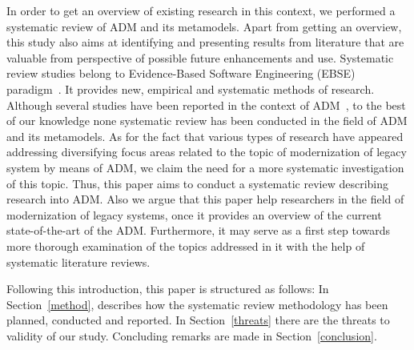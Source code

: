In order to get an overview of existing research in this context, we performed a systematic review of ADM and its metamodels. Apart from getting an overview, this study also aims at identifying and presenting results from literature that are valuable from perspective of possible future enhancements and use. Systematic review studies belong to Evidence-Based Software Engineering (EBSE) paradigm~\cite{Kitchenham}. It provides new, empirical and systematic methods of research. Although several studies have been reported in the context of ADM~\cite{PerezCastillo20121370, SMR:SMR582, FuentesFernandez2012247, PrezCastillo2011519}, to the best of our knowledge none systematic review has been conducted in the field of ADM and its metamodels. As for the fact that various types of research have appeared addressing diversifying focus areas related to the topic of modernization of legacy system by means of ADM, we claim the need for a more systematic investigation of this topic. Thus, this paper aims to conduct a systematic review describing research into ADM. Also we argue that this paper help researchers in the field of modernization of legacy systems, once it provides an overview of the current state-of-the-art of the ADM. Furthermore, it may serve as a first step towards more thorough examination of the topics addressed in it with the help of systematic literature reviews.

Following this introduction, this paper is structured as follows: In Section~\ref{method}, describes how the systematic review methodology has been planned, conducted and reported. In Section~\ref{threats} there are the threats to validity of our study. Concluding remarks are made in Section~\ref{conclusion}.